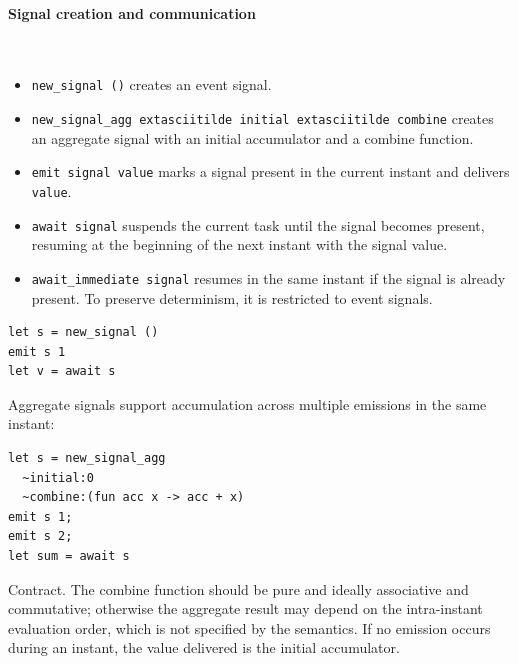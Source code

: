 \paragraph{Signal creation and communication}\mbox{}\\
\begin{itemize}
\item \texttt{new\_signal ()} creates an event signal.
\item \texttt{new\_signal\_agg extasciitilde initial extasciitilde combine}
  creates an aggregate signal with an initial accumulator and a combine
  function.
\item \texttt{emit signal value} marks a signal present in the current instant
  and delivers \texttt{value}.
\item \texttt{await signal} suspends the current task until the signal becomes
  present, resuming at the beginning of the next instant with the signal
  value.
\item \texttt{await\_immediate signal} resumes in the same instant if the signal
  is already present. To preserve determinism, it is restricted to event
  signals.
\end{itemize}
\begin{lstlisting}[style=tempo]
let s = new_signal ()
emit s 1
let v = await s
\end{lstlisting}

Aggregate signals support accumulation across multiple emissions in the same
instant:
\begin{lstlisting}[style=tempo]
let s = new_signal_agg
  ~initial:0
  ~combine:(fun acc x -> acc + x)
emit s 1;
emit s 2;
let sum = await s
\end{lstlisting}
Contract. The combine function should be pure and ideally associative and
commutative; otherwise the aggregate result may depend on the intra-instant
evaluation order, which is not specified by the semantics. If no emission
occurs during an instant, the value delivered is the initial accumulator.

